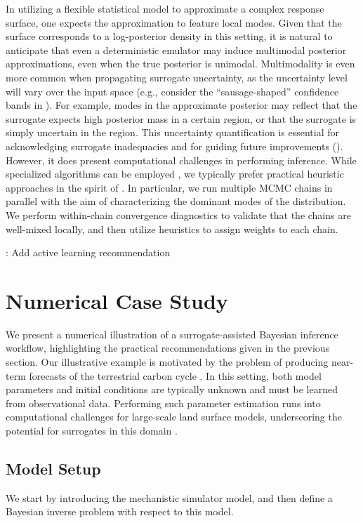 \documentclass[12pt]{article}
\begin{document}
In utilizing a flexible statistical model to approximate a complex response surface, one expects
the approximation to feature local modes. Given that the surface corresponds to a
log-posterior density in this setting, it is natural to anticipate that even a deterministic emulator
may induce multimodal posterior approximations, even when the true posterior is unimodal. 
Multimodality is even more common when propagating surrogate uncertainty, as the uncertainty 
level will vary over the input space (e.g., consider the ``sausage-shaped'' confidence 
bands in ). For example, modes in the approximate posterior may reflect
that the surrogate expects high posterior mass in a certain region, or that the surrogate is simply 
uncertain in the region. This uncertainty quantification is essential for acknowledging surrogate 
inadequacies and for guiding future improvements (). However, it does
present computational challenges in performing inference. While specialized algorithms 
can be employed \citep{adaptiveMultimodal}, we typically prefer practical heuristic approaches
in the spirit of \citep{multimodalYao}. In particular, we run multiple MCMC chains in parallel with 
the aim of characterizing the dominant modes of the distribution. We perform within-chain 
convergence diagnostics to validate that the chains are well-mixed locally, and then 
utilize heuristics to assign weights to each chain.

\vspace

\todo: Add active learning recommendation

\section{Numerical Case Study} \label{sec:case-study}
We present a numerical illustration of a surrogate-assisted Bayesian inference workflow, highlighting
the practical recommendations given in the previous section.
Our illustrative example is motivated by the problem of producing near-term forecasts of the 
terrestrial carbon cycle \citep{nearTermForecasts,FerEmulation}. In this setting, both model parameters 
and initial conditions are typically unknown and must be learned from observational data. Performing 
such parameter estimation runs into computational challenges for large-scale land surface models, 
underscoring the potential for surrogates in this domain \citep{paramLSM}.  

\subsection{Model Setup}
We start by introducing the mechanistic simulator model, and then define a Bayesian inverse 
problem with respect to this model.
\end{document}
